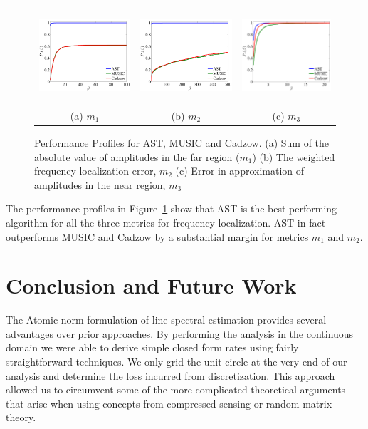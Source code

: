 \begin{figure}[htp]
\begin{tabular}{ccc}
	\includegraphics[height=35mm]{figures/m1_pp.pdf} &
	\includegraphics[height=35mm]{figures/m2_pp.pdf} &
	\includegraphics[height=35mm]{figures/m3_pp.pdf}\\
	(a) $m_1$ & (b) $m_2$ & (c) $m_3$
\end{tabular}
\caption{ Performance Profiles for AST, MUSIC and Cadzow.
(a) Sum of the absolute value of amplitudes in the far region ($m_1$)
(b) The weighted frequency localization error, $m_2$
(c) Error in approximation of amplitudes in the near region, $m_3$ }
\label{fig:pp2}
\end{figure}

The performance profiles in Figure~\ref{fig:pp2} show that AST is the best
performing algorithm for all the three metrics for frequency localization. AST
in fact outperforms MUSIC and Cadzow by a substantial margin for metrics $m_1$
and $m_2$.


\section{Conclusion and Future Work}\label{sec:conclusions}

The Atomic norm formulation of line spectral estimation provides several
advantages over prior approaches. By performing the analysis in the continuous
domain we were able to derive simple closed form rates using fairly
straightforward techniques. We only grid the unit circle at the very end of our
analysis and determine the loss incurred from discretization. This approach
allowed us to circumvent some of the more complicated theoretical arguments that
arise when using concepts from compressed sensing or random matrix theory.

